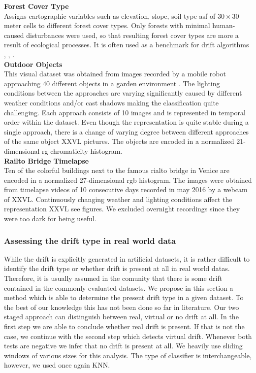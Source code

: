 \documentclass[conference]{IEEEtran}
\begin{document}
\textbf{Forest Cover Type}\\
Assigns cartographic variables such as elevation, slope, soil type asf of $30 \times 30$ meter cells to different forest cover types. 
Only forests with minimal human-caused disturbances were used, so that resulting forest cover types are more a result of ecological processes.
It is often used as a benchmark for drift algorithms \cite{Bifet:2013:EDS:2480362.2480516}, \cite{gama2003accurate}, \cite{oza2001experimental}.\\
\textbf{Outdoor Objects}\\
This visual dataset was obtained from images recorded by a mobile robot approaching 40 different objects in a garden environment \cite{losing2015interactive}. The lighting conditions between 
the approaches are varying significantly caused by different weather conditions and/or cast shadows making the classification quite challenging. Each approach
consists of 10 images and is represented in temporal order within the dataset. Even though the representation is quite stable during a single approach, there is a change of varying degree between different
approaches of the same object XXVL pictures. The objects are encoded in a normalized 21-dimensional rg-chromaticity histogram.\\
\textbf{Railto Bridge Timelapse}\\
Ten of the colorful buildings next to the famous rialto bridge in Venice are encoded in a normalized 27-dimensional rgb histogram. 
The images were obtained from timelapse videos of 10 consecutive days recorded in may 2016 by a webcam of XXVL. Continuously changing weather and lighting conditions affect the representation  XXVL see figures. We excluded overnight recordings since they were too dark for being useful.
\subsubsection{Assessing the drift type in real world data}\label{driftType}
While the drift is explicitly generated in artificial datasets, it is rather difficult to identify the drift type or whether drift is present at all in real world datas. Therefore, it is usually
assumed in the comunity that there is some drift contained in the commonly evaluated datasets. We propose in this section a method which is able to determine the present drift type in a 
given dataset. To the best of our knowledge this has not been done so far in literature. Our two staged approach can distinguish between real, virtual or no drift at all. 
In the first step we are able to conclude whether real drift is present. If that is not the case, we continue with the second step which detects virtual drift. 
Whenever both tests are negative we infer that no drift is present at all. We heavily use sliding windows of various sizes for this analysis. 
The type of classifier is interchangeable, however, we used once again KNN.\\
\end{document}

